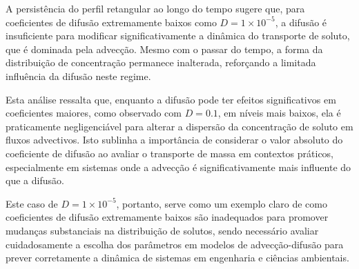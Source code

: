 A persistência do perfil retangular ao longo do tempo sugere que, para coeficientes de difusão extremamente baixos como \( D = 1 \times 10^{-5} \), a difusão é insuficiente para modificar significativamente a dinâmica do transporte de soluto, que é dominada pela advecção. Mesmo com o passar do tempo, a forma da distribuição de concentração permanece inalterada, reforçando a limitada influência da difusão neste regime.

Esta análise ressalta que, enquanto a difusão pode ter efeitos significativos em coeficientes maiores, como observado com \( D = 0.1 \), em níveis mais baixos, ela é praticamente negligenciável para alterar a dispersão da concentração de soluto em fluxos advectivos. Isto sublinha a importância de considerar o valor absoluto do coeficiente de difusão ao avaliar o transporte de massa em contextos práticos, especialmente em sistemas onde a advecção é significativamente mais influente do que a difusão.

Este caso de \( D = 1 \times 10^{-5} \), portanto, serve como um exemplo claro de como coeficientes de difusão extremamente baixos são inadequados para promover mudanças substanciais na distribuição de solutos, sendo necessário avaliar cuidadosamente a escolha dos parâmetros em modelos de advecção-difusão para prever corretamente a dinâmica de sistemas em engenharia e ciências ambientais.
